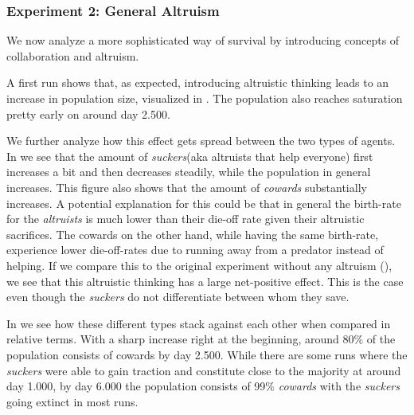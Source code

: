 \documentclass[sigconf]{acmart}
\newcommand{\cowards}{\textit{cowards}\xspace}
\newcommand{\altruists}{\textit{altruists}\xspace}
\newcommand{\suckers}{\textit{suckers}\xspace}
\begin{document}
    \subsubsection*{Experiment 2: General Altruism}

    We now analyze a more sophisticated way of survival by introducing concepts of collaboration and altruism.

    A first run shows that, as expected, introducing altruistic thinking leads to an increase in population size, visualized in .
    The population also reaches saturation pretty early on around day 2.500.

    We further analyze how this effect gets spread between the two types of agents.
    In  we see that the amount of \suckers (aka altruists that help everyone) first increases a bit and then decreases steadily, while the population in general increases.
    This figure also shows that the amount of \cowards substantially increases.
    A potential explanation for this could be that in general the birth-rate for the \altruists is much lower than their die-off rate given their altruistic sacrifices.
    The cowards on the other hand, while having the same birth-rate, experience lower die-off-rates due to running away from a predator instead of helping.
    If we compare this to the original experiment without any altruism (), we see that this altruistic thinking has a large net-positive effect.
    This is the case even though the \suckers do not differentiate between whom they save.


    In  we see how these different types stack against each other when compared in relative terms.
    With a sharp increase right at the beginning, around $80\%$ of the population consists of cowards by day 2.500.
    While there are some runs where the \suckers were able to gain traction and constitute close to the majority at around day 1.000, by day 6.000 the population consists of 99\% \cowards with the \suckers going extinct in most runs.
\end{document}
